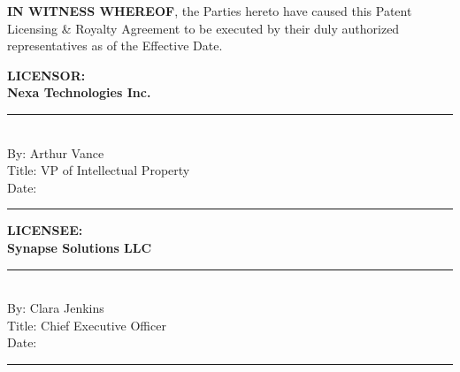\vspace{2.0em}

\textbf{IN WITNESS WHEREOF}, the Parties hereto have caused this Patent Licensing \& Royalty Agreement to be executed by their duly authorized representatives as of the Effective Date.

\vspace{2.5em}

\begin{minipage}[t]{0.45\textwidth}
  \textbf{LICENSOR:} \\
  \textbf{Nexa Technologies Inc.} \\
  
  \vspace{3em}
  \rule{2.2in}{0.5pt} \\
  By: Arthur Vance \\
  Title: VP of Intellectual Property \\
  Date: \rule{1.5in}{0.5pt}
\end{minipage}
\hfill
\begin{minipage}[t]{0.45\textwidth}
  \textbf{LICENSEE:} \\
  \textbf{Synapse Solutions LLC} \\
  
  \vspace{3em}
  \rule{2.2in}{0.5pt} \\
  By: Clara Jenkins \\
  Title: Chief Executive Officer \\
  Date: \rule{1.5in}{0.5pt}
\end{minipage}
